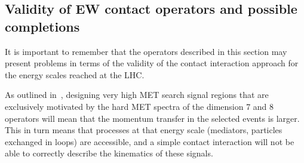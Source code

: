 %
%
%
%


\subsection{Validity of EW contact operators and possible completions}

It is important to remember that the operators described in 
this section may present problems in terms of the validity of the contact interaction
approach for the energy scales reached at the LHC. 

As outlined in~\cite{Berlin:2014cfa}, designing very high MET search signal regions
that are exclusively motivated by the hard MET spectra of the dimension 7 and 8 operators
will mean that the momentum transfer in the selected events is larger. This in turn
means that processes at that energy scale (mediators, particles exchanged in loops)
are accessible, and a simple contact interaction will not be able to correctly
describe the kinematics of these signals. 

